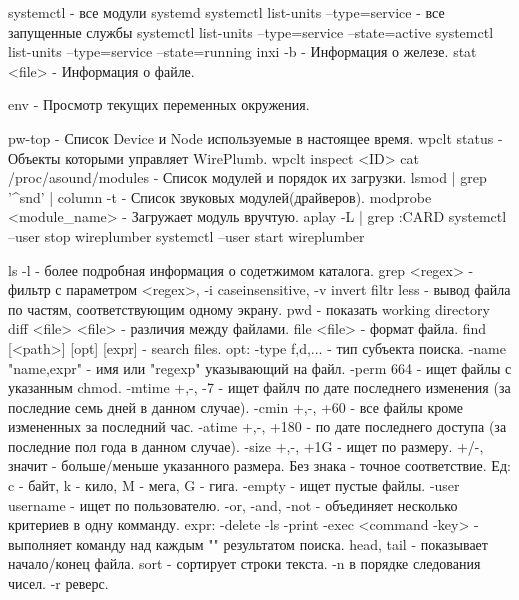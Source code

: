 systemctl - все модули systemd 
systemctl list-units --type=service - все запущенные службы
systemctl list-units --type=service --state=active
systemctl list-units --type=service --state=running
inxi -b - Информация о железе.
stat <file> - Информация о файле.

env - Просмотр текущих переменных окружения.


pw-top - Список Device и Node используемые в настоящее время.
wpclt status - Объекты которыми управляет WirePlumb.
wpclt inspect <ID>
cat /proc/asound/modules - Список модулей и порядок их загрузки.
lsmod | grep '^snd' | column -t - Список звуковых модулей(драйверов).
modprobe <module_name> - Загружает модуль вручтую.
aplay -L | grep :CARD
systemctl --user stop wireplumber
systemctl --user start wireplumber

ls -l              - более подробная информация о содетжимом каталога.
grep <regex>       - фильтр с параметром <regex>, -i caseinsensitive, -v invert filtr
less               - вывод файла по частям, соответствующим одному экрану.
pwd                - показать working directory
diff <file> <file> - различия между файлами.
file <file>        - формат файла. 
find [<path>] [opt] [expr] - search files.
    opt:
        -type {f,d,...} - тип субъекта поиска.
        -name "name,expr" - имя или "regexp" указывающий на файл.
        -perm 664 - ищет файлы с указанным chmod.
        -mtime {+,-, } -7 - ищет файлч по дате последнего изменения (за 
            последние семь дней в данном случае).
        -cmin  {+,-, } +60 - все файлы кроме измененных за последний час.
        -atime {+,-, } +180 - по дате последнего доступа (за последние пол года
            в данном случае).
        -size  {+,-, } +1G - ищет по размеру. +/-, значит - больше/меньше 
            указанного размера. Без знака - точное соответствие. 
            Ед: c - байт, k - кило, M - мега, G - гига.
        -empty - ищет пустые файлы.
        -user username - ищет по пользователю.
        -or, -and, -not - объединяет несколько критериев в одну комманду.
    expr:
        -delete
        -ls
        -print
        -exec <command -key> {} \; - выполняет команду над каждым "{}" 
            результатом поиска.
head, tail         - показывает начало/конец файла.
sort               - сортирует строки текста. -n в порядке следования чисел. -r реверс.

